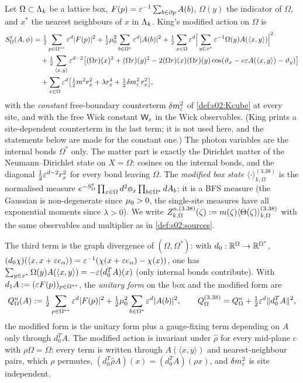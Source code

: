 \begin{definition}\label{def:s07:box}
Let $\Omega\subset\Lambda_k$ be a lattice box, $F(p)=\varepsilon^{-1}\sum_{b\in\partial p}A(b)$, $\Omega(y)$ the indicator of $\Omega$, and $x^*$ the nearest neighbours of $x$ in $\Lambda_k$. King's modified action \cite[(3.38)]{K2} on $\Omega$ is
\begin{align*}
S^{\varepsilon}_\Omega(A,\phi)&=\tfrac12\sum_{p\in\Omega^{**}}\varepsilon^d|F(p)|^2+\tfrac12\mu_0^2\sum_{b\in\Omega^*}\varepsilon^d|A(b)|^2+\tfrac12\sum_{x\in\Omega}\varepsilon^d\Big|\sum_{y\in x^*}\varepsilon^{-1}\Omega(y)A(\langle x,y\rangle)\Big|^2\\
&\quad+\tfrac12\sum_{\langle x,y\rangle}\varepsilon^{d-2}\big[(\Omega r)(x)^2+(\Omega r)(y)^2-2(\Omega r)(x)(\Omega r)(y)\cos(\vartheta_x-e\varepsilon A(\langle x,y\rangle)-\vartheta_y)\big]\\
&\quad+\sum_{x\in\Omega}\varepsilon^d\big[\tfrac12m^2r_x^2+\lambda r_x^4+\tfrac12\delta m^2_{\varepsilon}\,r_x^2\big],
\end{align*}
with the \emph{constant} free-boundary counterterm $\delta m^2_{\varepsilon}$ of \cref{def:s02:Kcube} at every site, and with the free Wick constant $\mathsf W_{\varepsilon}$ in the Wick observables. (King prints a site-dependent counterterm in the last term; it is not used here, and the statements below are made for the constant one.) The photon variables are the internal bonds $\Omega^*$ only. The matter part is exactly the Dirichlet matter of the Neumann--Dirichlet state on $X=\Omega$: cosines on the internal bonds, and the diagonal $\frac12\varepsilon^{d-2}r_x^2$ for every bond leaving $\Omega$. The \emph{modified box state} $\langle\cdot\rangle^{(3.38)}_{k,\Omega}$ is the normalised measure $e^{-S^{\varepsilon}_\Omega}\prod_{x\in\Omega}d^2\phi_x\prod_{b\in\Omega^*}dA_b$; it is a BFS measure (the Gaussian is non-degenerate since $\mu_0>0$, the single-site measures have all exponential moments since $\lambda>0$). We write $Z^{a,(3.38)}_{k,\Omega}(\zeta):= m(\zeta)\langle\Theta(\zeta)\rangle^{(3.38)}_{k,\Omega}$ with the same observables and multiplier as in \cref{def:s02:sources}.

The third term is the graph divergence of $(\Omega,\Omega^*)$: with $d_0:\mathbb R^\Omega\to\mathbb R^{\Omega^*}$, $(d_0\chi)(\langle x,x+\varepsilon e_\alpha\rangle)=\varepsilon^{-1}(\chi(x+\varepsilon e_\alpha)-\chi(x))$, one has $\sum_{y\in x^*}\Omega(y)A(\langle x,y\rangle)=-\varepsilon(d_0^TA)(x)$ (only internal bonds contribute). With $d_1A:=(\varepsilon F(p))_{p\in\Omega^{**}}$, the \emph{unitary form} on the box and the modified form are
\[
Q^u_\Omega(A):=\tfrac12\sum_{p\in\Omega^{**}}\varepsilon^d|F(p)|^2+\tfrac12\mu_0^2\sum_{b\in\Omega^*}\varepsilon^d|A(b)|^2,\qquad Q^{(3.38)}_\Omega=Q^u_\Omega+\tfrac12\varepsilon^d\|d_0^TA\|^2 ,
\]
\ie the modified form is the unitary form plus a gauge-fixing term depending on $A$ only through $d_0^TA$. The modified action is invariant under $\hat\rho$ for every mid-plane $c$ with $\rho\Omega=\Omega$: every term is written through $A(\langle x,y\rangle)$ and nearest-neighbour pairs, which $\rho$ permutes, $(d_0^T\hat\rho A)(x)=(d_0^TA)(\rho x)$, and $\delta m^2_{\varepsilon}$ is site independent.
\end{definition}

